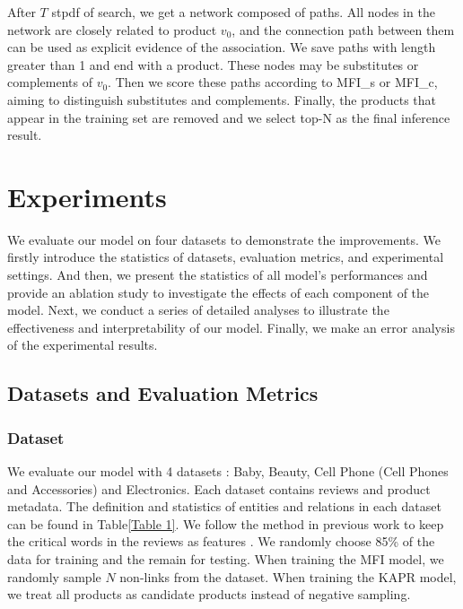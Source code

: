 \documentclass[review]{elsarticle}
\begin{document}
\begin{sloppypar}
After $T$ stpdf of search, we get a network composed of paths. All nodes in the network are closely related to product $v_{0}$, and the connection path between them can be used as explicit evidence of the association. 
We save paths with length greater than 1 and end with a product.
These nodes may be substitutes or complements of $v_{0}$. Then we score these paths according to MFI\_s or MFI\_c, aiming to distinguish substitutes and complements.
Finally, the products that appear in the training set are removed and we select top-N as the final inference result.


\section{Experiments}
We evaluate our model on four datasets to demonstrate the improvements. 
We firstly introduce the statistics of datasets, evaluation metrics, and experimental settings. 
And then, we present the statistics of all model’s performances and provide an ablation study to investigate the effects of each component of the model.
Next, we conduct a series of detailed analyses to illustrate the effectiveness and interpretability of our model.
Finally, we make an error analysis of the experimental results.
\subsection{Datasets and Evaluation Metrics}
\subsubsection{Dataset}
We evaluate our model with 4 datasets \cite{he2016ups_dataset}: Baby, Beauty, Cell Phone (Cell Phones and Accessories) and Electronics. Each dataset contains reviews and product metadata. 
The definition and statistics of entities and relations in each dataset can be found in Table\ref{Table 1}. We follow the method in previous work to keep the critical words in the reviews as features \cite{xian2019reinforcement}.
We randomly choose 85\% of the data for training and the remain for testing. When training the MFI model, we randomly sample $N$ non-links from the dataset. When training the KAPR model,  we treat all products as candidate products instead of negative sampling.


\end{sloppypar}
\end{document}
